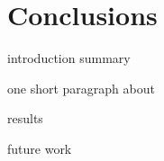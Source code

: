 \chapter{Conclusions}
\label{conclusionschap}

introduction summary

one short paragraph about

results

future work